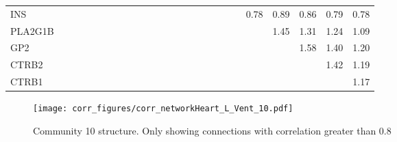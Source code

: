 \begin{longtable}{lrrrrrrrrrrrrrrrrrrrrrrrr}
INS      &              &              &              &              &             &             &             &             &            &              &            &            &            &             &             &           &             &                &           &          0.78 &      0.89 &        0.86 &        0.79 &       0.78 \\
PLA2G1B  &              &              &              &              &             &             &             &             &            &              &            &            &            &             &             &           &             &                &           &               &      1.45 &        1.31 &        1.24 &       1.09 \\
GP2      &              &              &              &              &             &             &             &             &            &              &            &            &            &             &             &           &             &                &           &               &           &        1.58 &        1.40 &       1.20 \\
CTRB2    &              &              &              &              &             &             &             &             &            &              &            &            &            &             &             &           &             &                &           &               &           &             &        1.42 &       1.19 \\
CTRB1    &              &              &              &              &             &             &             &             &            &              &            &            &            &             &             &           &             &                &           &               &           &             &             &       1.17 \\
\end{longtable}


\begin{figure}[h!]
\centering
\texttt{[image: corr\_figures/corr\_networkHeart\_L\_Vent\_10.pdf]}
\caption{Community 10 structure. Only showing connections with correlation greater than 0.8}
\end{figure}




